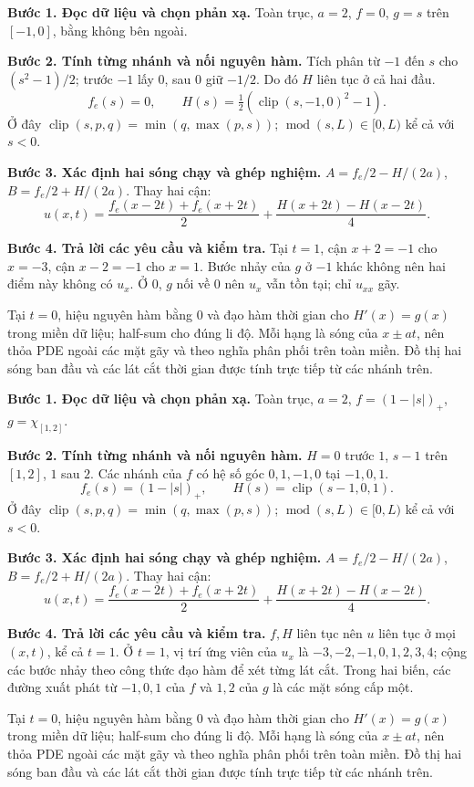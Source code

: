 \textbf{Bước 1. Đọc dữ liệu và chọn phản xạ.} Toàn trục, $a=2$, $f=0$, $g=s$ trên $[-1,0]$, bằng không bên ngoài.

\textbf{Bước 2. Tính từng nhánh và nối nguyên hàm.} Tích phân từ $-1$ đến $s$ cho $(s^2-1)/2$; trước $-1$ lấy $0$, sau $0$ giữ $-1/2$. Do đó $H$ liên tục ở cả hai đầu.
\[f_e(s)=0,\qquad H(s)=\tfrac12(\operatorname{clip}(s,-1,0)^2-1).\]
Ở đây $\operatorname{clip}(s,p,q)=\min(q,\max(p,s))$; $\operatorname{mod}(s,L)\in[0,L)$ kể cả với $s<0$.

\textbf{Bước 3. Xác định hai sóng chạy và ghép nghiệm.} $A=f_e/2-H/(2a)$, $B=f_e/2+H/(2a)$. Thay hai cận:
\[u(x,t)=\frac{f_e(x-2t)+f_e(x+2t)}2+\frac{H(x+2t)-H(x-2t)}{4}.\]

\textbf{Bước 4. Trả lời các yêu cầu và kiểm tra.} Tại $t=1$, cận $x+2=-1$ cho $x=-3$, cận $x-2=-1$ cho $x=1$. Bước nhảy của $g$ ở $-1$ khác không nên hai điểm này không có $u_x$. Ở $0$, $g$ nối về $0$ nên $u_x$ vẫn tồn tại; chỉ $u_{xx}$ gãy.

Tại $t=0$, hiệu nguyên hàm bằng $0$ và đạo hàm thời gian cho $H'(x)=g(x)$ trong miền dữ liệu; half-sum cho đúng li độ. Mỗi hạng là sóng của $x\pm at$, nên thỏa PDE ngoài các mặt gãy và theo nghĩa phân phối trên toàn miền. Đồ thị hai sóng ban đầu và các lát cắt thời gian được tính trực tiếp từ các nhánh trên.

\textbf{Bước 1. Đọc dữ liệu và chọn phản xạ.} Toàn trục, $a=2$, $f=(1-|s|)_+$, $g=\chi_{[1,2]}$.

\textbf{Bước 2. Tính từng nhánh và nối nguyên hàm.} $H=0$ trước $1$, $s-1$ trên $[1,2]$, $1$ sau $2$. Các nhánh của $f$ có hệ số góc $0,1,-1,0$ tại $-1,0,1$.
\[f_e(s)=(1-|s|)_+,\qquad H(s)=\operatorname{clip}(s-1,0,1).\]
Ở đây $\operatorname{clip}(s,p,q)=\min(q,\max(p,s))$; $\operatorname{mod}(s,L)\in[0,L)$ kể cả với $s<0$.

\textbf{Bước 3. Xác định hai sóng chạy và ghép nghiệm.} $A=f_e/2-H/(2a)$, $B=f_e/2+H/(2a)$. Thay hai cận:
\[u(x,t)=\frac{f_e(x-2t)+f_e(x+2t)}2+\frac{H(x+2t)-H(x-2t)}{4}.\]

\textbf{Bước 4. Trả lời các yêu cầu và kiểm tra.} $f,H$ liên tục nên $u$ liên tục ở mọi $(x,t)$, kể cả $t=1$. Ở $t=1$, vị trí ứng viên của $u_x$ là $-3,-2,-1,0,1,2,3,4$; cộng các bước nhảy theo công thức đạo hàm để xét từng lát cắt. Trong hai biến, các đường xuất phát từ $-1,0,1$ của $f$ và $1,2$ của $g$ là các mặt sóng cấp một.

Tại $t=0$, hiệu nguyên hàm bằng $0$ và đạo hàm thời gian cho $H'(x)=g(x)$ trong miền dữ liệu; half-sum cho đúng li độ. Mỗi hạng là sóng của $x\pm at$, nên thỏa PDE ngoài các mặt gãy và theo nghĩa phân phối trên toàn miền. Đồ thị hai sóng ban đầu và các lát cắt thời gian được tính trực tiếp từ các nhánh trên.

